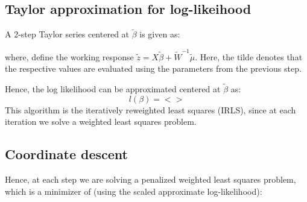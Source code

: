 \documentclass[12pt,a4paper]{report}
\begin{document}

\subsection*{Taylor approximation for log-likeihood}

A 2-step Taylor series centered at $\widetilde \beta$ is given as:


where, define the working response $\widetilde{z} = X \widetilde{\beta} + \widetilde{W}^{-1} \widetilde{\mu}$.
Here, the tilde denotes that the respective values are evaluated using the parameters from the previous step.

Hence, the log likelihood can be approximated centered at $\widetilde \beta$ as:
\begin{equation}
  l(\beta) = <>
\end{equation}
This algorithm is the iteratively reweighted least squares (IRLS), since at each iteration we solve a weighted least squares problem.

\subsection*{Coordinate descent}

Hence, at each step we are solving a penalized weighted least squares problem, which is a minimizer of (using the scaled approximate log-likelihood):
\end{document}
